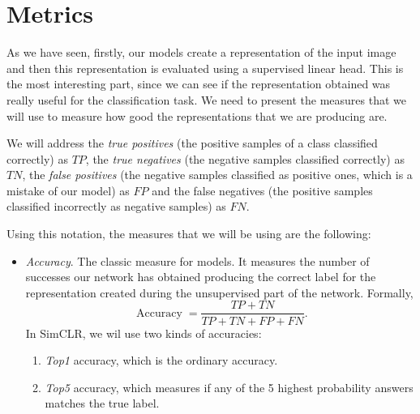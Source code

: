 \section{Metrics}

As we have seen, firstly, our models create a representation of the input image and then this representation is evaluated using a supervised linear head. This is the most interesting part, since we can see if the representation obtained was really useful for the classification task. We need to present the measures that we will use to measure how good the representations that we are producing are.



\begin{notation}
We will address the \emph{true positives} (the positive samples of a class classified correctly) as $TP$, the \emph{true negatives} (the negative samples classified correctly) as $TN$, the \emph{false positives} (the negative samples classified as positive ones, which is a mistake of our model) as $FP$ and the false negatives (the positive samples classified incorrectly as negative samples) as $FN$.
\end{notation}

Using this notation, the measures that we will be using are the following:

\begin{itemize}
\item \emph{Accuracy}. The classic measure for models. It measures the number of successes our network has obtained producing the correct label for the representation created during the unsupervised part of the network. Formally,
\[
\operatorname{Accuracy} = \frac{TP + TN}{TP + TN + FP + FN}  .  
\] 
In SimCLR, we wil use two kinds of accuracies:
\begin{enumerate}
\item \emph{Top1} accuracy, which is the ordinary accuracy.
\item \emph{Top5} accuracy, which measures if any of the 5 highest probability answers matches the true label.
\end{enumerate}
\end{itemize}




